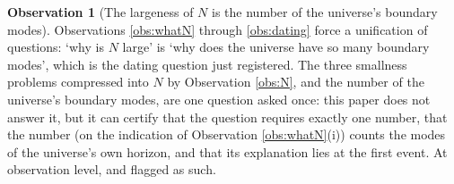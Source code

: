 \documentclass[11pt]{article}
\theoremstyle{definition}
\newtheorem{observation}[theorem]{Observation}
\begin{document}
\begin{observation}[The largeness of $N$ is the number of the universe's boundary modes]\label{obs:length}
Observations \ref{obs:whatN} through \ref{obs:dating} force a unification of questions: `why is $N$ large' is `why does the universe have so many boundary modes', which is the dating question just registered. The three smallness problems compressed into $N$ by Observation \ref{obs:N}, and the number of the universe's boundary modes, are one question asked once: this paper does not answer it, but it can certify that the question requires exactly one number, that the number (on the indication of Observation \ref{obs:whatN}(i)) counts the modes of the universe's own horizon, and that its explanation lies at the first event. At observation level, and flagged as such.
\end{observation}
\end{document}
